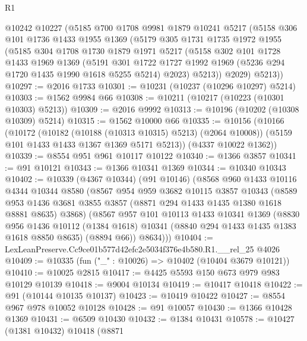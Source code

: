 \begin{lexlean}{R1}
\begin{coremodule}
    @10242
    @10227
    (@5185
      @700
      @1708
      @9981
      @1879
      @10241
      @5217
      (@5158
        @306
        @101
        @1736
        @1433
        @1955
        @1369
        (@5179
          @305
          @1731
          @1735
          @1972
          @1955
          (@5185
            @304
            @1708
            @1730
            @1879
            @1971
            @5217
            (@5158
              @302
              @101
              @1728
              @1433
              @1969
              @1369
              (@5191
                @301
                @1722
                @1727
                @1992
                @1969
                (@5236 @294 @1720 @1435 @1990 @1618 @5255 @5214)
                @2023)
              @5213))
          @2029)
        @5213))
@10297 := @2016 @1733
@10301 := @10231 (@10237 (@10296 @10297) @5214)
@10303 := @1562 @9984 @66
@10308 := @10211 (@10217 (@10223 (@10301 @10303) @5213))
@10309 := @2016 @9992
@10313 := @10196 (@10202 (@10308 @10309) @5214)
@10315 := @1562 @10000 @66
@10335 := @10156
    (@10166
      (@10172
        (@10182 (@10188 (@10313 @10315) @5213) (@2064 @10008))
        (@5159 @101 @1433 @1433 @1367 @1369 @5171 @5213))
      (@4337 @10022 @1362))
@10339 := @8554 @951 @961 @10117 @10122
@10340 := @1366 @3857
@10341 := @91 @10121
@10343 := @1366 @10341 @1369
@10344 := @10340 @10343
@10402 := @10339
    (@4367 @10344)
    (@91 @10146)
    (@8568
      @960
      @1433
      @10116
      @4344
      @10344
      @8580
      (@8567
        @954
        @959
        @3682
        @10115
        @3857
        @10343
        (@8589 @953 @1436 @3681 @3855 @3857 (@8871 @294 @1433 @1435 @1380 @1618 @8881 @8635) @3868)
        (@8567
          @957
          @101
          @10113
          @1433
          @10341
          @1369
          (@8830
            @956
            @1436
            @10112
            (@1384 @1618)
            @10341
            (@8840 @294 @1433 @1435 @1383 @1618 @8850 @8635)
            (@8894 @66))
          @8634)))
@10404 := LexLeanPreserve.Cc9ce01b577d42efc2e5034f376e4b580.R1.__rel_25 @4026
@10409 := @10335 (fun ("_" : @10026) => @10402 (@10404 @3679 @10121))
@10410 := @10025 @2815
@10417 := @4425 @5593 @150 @673 @979 @983 @10129 @10139
@10418 := @9004 @10134
@10419 := @10417 @10418
@10422 := @91 (@10144 @10135 @10137)
@10423 := @10419 @10422
@10427 := @8554 @967 @978 @10052 @10128
@10428 := @91 @10057
@10430 := @1366 @10428 @1369
@10431 := @6509 @10430
@10432 := @1384 @10431
@10578 := @10427
    (@1381 @10432)
    @10418
    (@8871

\end{coremodule}
\end{lexlean}
